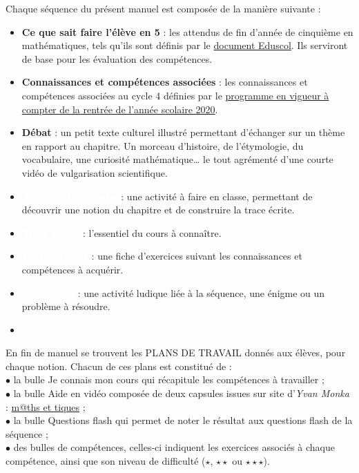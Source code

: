 Chaque séquence du présent manuel est composée de la manière suivante : \\
\begin{itemize}
   \item \colorbox{J4}{\textcolor{B2}{\sffamily\bfseries Ce que sait faire l'élève en 5}} : les attendus de fin d'année de cinquième en mathématiques, tels qu'ils sont définis par le \href{https://eduscol.education.fr/document/14044/download}{document Eduscol}. Ils serviront de base pour les évaluation des compétences. \medskip
   \item \textcolor{B2}{\sffamily\bfseries Connaissances et compétences associées} : les connaissances et compétences associées au cycle 4 définies par le \href{https://eduscol.education.fr/document/621/download}{programme en vigueur à compter de la rentrée de l'année scolaire 2020}. \medskip
   \item \textcolor{B1}{\sffamily\bfseries Débat} : un petit texte culturel illustré permettant d'échanger sur un thème en rapport au chapitre. Un morceau d'histoire, de l'étymologie, du vocabulaire, une curiosité mathématique\dots{} le tout agrémenté d'une courte vidéo de vulgarisation scientifique. \medskip
   \item \colorbox{A2}{\textcolor{white}{\sffamily\bfseries Activité d'approche}} : une activité à faire en classe, permettant de découvrir une notion du chapitre et de construire la trace écrite. \medskip
   \item \colorbox{A1}{\textcolor{white}{\sffamily\bfseries Trace écrite}} : l'essentiel du cours à connaître. \medskip
   \item \colorbox{B1}{\textcolor{white}{\sffamily\bfseries Entraînement}} : une fiche d'exercices suivant les connaissances et compétences à acquérir. \medskip
   \item \colorbox{B2}{\textcolor{white}{\sffamily\bfseries Récréation}} : une activité ludique liée à la séquence, une énigme ou un problème à résoudre.
   \item
\end{itemize}

\bigskip

En fin de manuel se trouvent les {\sffamily PLANS DE TRAVAIL} donnés aux élèves, pour chaque notion. Chacun de ces plans est constitué de : \\
   $\bullet$ la bulle \og Je connais mon cours \fg{} qui récapitule les compétences à travailler ; \\
   $\bullet$ la bulle \og Aide en vidéo \fg{} composée de deux capsules issues sur site d'{\it Yvan Monka} : \href{https://www.maths-et-tiques.fr}{m@ths et tiques} ; \\
   $\bullet$ la bulle \og Questions flash \fg{} qui permet de noter le résultat aux questions flash de la séquence ; \\
   $\bullet$ des bulles de compétences, celles-ci indiquent les exercices associés à chaque compétence, ainsi que son niveau de difficulté ($\star$, $\star\star$ ou $\star\star\star$).
   
